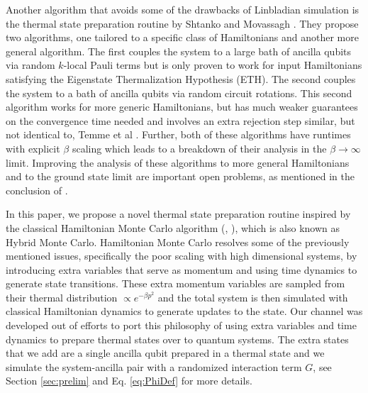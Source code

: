 \documentclass[
 amsmath,amssymb,
 aps,
onecolumn, 
nofootinbib]{revtex4-2}
\begin{document}
Another algorithm that avoids some of the drawbacks of Linbladian simulation is the thermal state preparation routine by Shtanko and Movassagh \cite{shtanko2023preparingthermalstatesnoiseless}. They propose two algorithms, one tailored to a specific class of Hamiltonians and another more general algorithm. The first couples the system to a large bath of ancilla qubits via random $k$-local Pauli terms but is only proven to work for input Hamiltonians satisfying the Eigenstate Thermalization Hypothesis (ETH). The second couples the system to a bath of ancilla qubits via random circuit rotations. This second algorithm works for more generic Hamiltonians, but has much weaker guarantees on the convergence time needed and involves an extra rejection step similar, but not identical to, Temme et al \cite{temme2011}. Further, both of these algorithms have runtimes with explicit $\beta$ scaling which leads to a breakdown of their analysis in the $\beta \to \infty$ limit. Improving the analysis of these algorithms to more general Hamiltonians and to the ground state limit are important open problems, as mentioned in the conclusion of \cite{shtanko2023preparingthermalstatesnoiseless}.

In this paper, we propose a novel thermal state preparation routine inspired by the classical Hamiltonian Monte Carlo algorithm (\cite{neal1993probabilistic}, \cite{hoffman2011nouturnsampleradaptivelysetting}), which is also known as Hybrid Monte Carlo. Hamiltonian Monte Carlo resolves some of the previously mentioned issues, specifically the poor scaling with high dimensional systems, by introducing extra variables that serve as momentum and using time dynamics to generate state transitions. These extra momentum variables are sampled from their thermal distribution $\propto e^{-\beta p^2}$ and the total system is then simulated with classical Hamiltonian dynamics to generate updates to the state. Our channel was developed out of efforts to port this philosophy of using extra variables and time dynamics to prepare thermal states over to quantum systems. The extra states that we add are a single ancilla qubit prepared in a thermal state and we simulate the system-ancilla pair with a randomized interaction term $G$, see Section \ref{sec:prelim} and Eq. \eqref{eq:PhiDef} for more details. 
\end{document}
